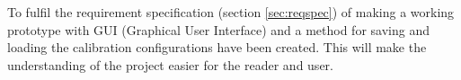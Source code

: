 To fulfil the requirement specification (section \ref{sec:reqspec}) of making a working prototype with GUI (Graphical User Interface) and a method for saving and loading the calibration configurations have been created. This will make the understanding of the project easier for the reader and user.